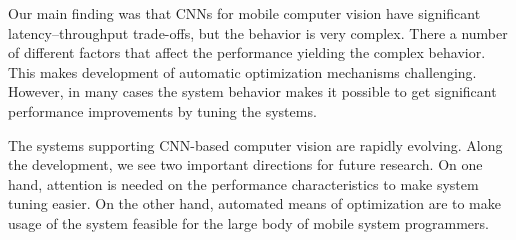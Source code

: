 \documentclass[sigconf]{acmart}
\begin{document}
Our main finding was that CNNs for mobile computer vision have significant latency--throughput trade-offs, but the behavior is very complex. There a number of different factors that affect the performance yielding the complex behavior. This makes development of automatic optimization mechanisms challenging. However, in many cases the system behavior makes it possible to get significant performance improvements by tuning the systems.

The systems supporting CNN-based computer vision are rapidly evolving. Along the development, we see two important directions for future research. On one hand, attention is needed on the performance characteristics to make system tuning easier. On the other hand, automated means of optimization are to make usage of the system feasible for the large body of mobile system programmers.








%

%

%

\end{document}
